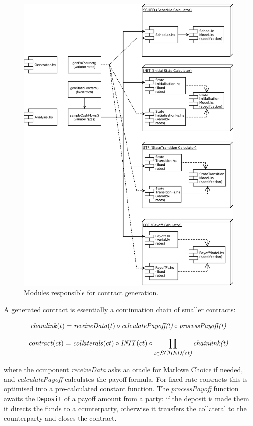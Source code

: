 \documentclass[runningheads]{llncs}
\newcommand{\ident}[1]{\mbox{\emph{#1}}}
\begin{document}
\begin{figure}
\includegraphics[width=1\textwidth]{images/modules} \caption{Modules responsible for contract generation.}
\label{fig1} 
\end{figure}

A generated contract is essentially a continuation chain of smaller contracts:

\noindent 
\begin{equation*}
\ident{chainlink}(t)=\ident{receiveData}(t)\circ \ident{calculatePayoff(t)}\circ \ident{processPayoff(t)}
\end{equation*}

\noindent 
\begin{equation*}
\ident{contract}(ct)=\ident{collaterals}(ct)\circ \ident{INIT}(ct)\circ\prod_{\footnotesize t\in \ident{SCHED(ct)}}\ident{chainlink(t)}
\end{equation*}

\noindent
where the component \emph{receiveData} asks an oracle for Marlowe Choice if needed, and
\mbox{\emph{calculatePayoff}} calculates the payoff formula. For fixed-rate contracts
this is optimised into a pre-calculated constant function. The \emph{processPayoff} function
awaits the \texttt{Deposit} of a payoff amount from a party: if the deposit is made them 
it directs the funds to a counterparty, otherwise it transfers
the collateral to the counterparty and closes the contract. 
\end{document}
